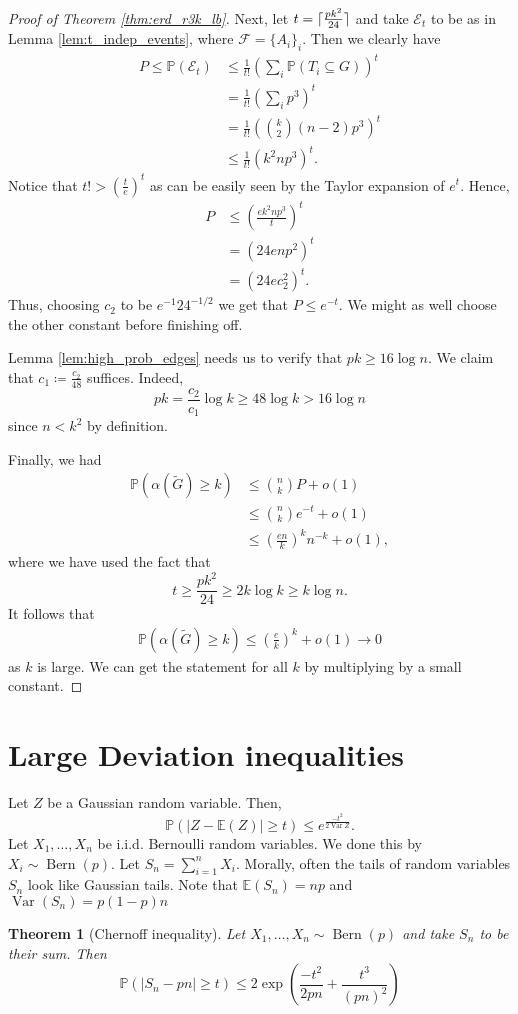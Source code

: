 \documentclass{report}
\DeclareMathOperator{\Var}{Var}
\DeclareMathOperator{\Bern}{Bern}
\DeclarePairedDelimiter\ceil{\lceil}{\rceil}
\theoremstyle{definition}
\theoremstyle{plain}
\newtheorem{thm}{Theorem}
\theoremstyle{definition}
\begin{document}
\begin{proof}[Proof of Theorem \ref{thm:erd_r3k_lb}]
		Next, let $t = \ceil{\frac{pk^2}{24}}$ and take $\mathcal{E}_t$ to be as in Lemma \ref{lem:t_indep_events}, where $\mathcal{F} = \{A_i\}_i$. Then we clearly have
		\begin{align*}
			P \leq \mathbb{P}(\mathcal{E}_t) &\leq \frac{1}{t!}\left(\sum_{i}\mathbb{P}(T_i\subseteq G)\right)^t\\
			&= \frac{1}{t!}\left(\sum_{i}p^3\right)^t\\
			&= \frac{1}{t!}\left(\binom{k}{2}(n-2) p^3\right)^t\\
			&\leq \frac{1}{t!}(k^2np^3)^t.
		\end{align*}
		Notice that $t!> \left(\frac{t}{e}\right)^t$ as can be easily seen by the Taylor expansion of $e^t$. Hence,
		\begin{align*}
			P &\leq \left(\frac{ek^2np^3}{t}\right)^t\\
			&= (24enp^2)^t\\
			&= (24ec_2^2)^t.
		\end{align*}
		Thus, choosing $c_2$ to be $e^{-1}24^{-1/2}$ we get that $P\leq e^{-t}$. We might as well choose the other constant before finishing off.
		
		Lemma \ref{lem:high_prob_edges} needs us to verify that $pk \geq 16\log n$. We claim that $c_1 \coloneqq \frac{c_2}{48}$ suffices. Indeed,
		\[
			pk = \frac{c_2}{c_1} \log k \geq 48 \log k > 16 \log n
		\]
		since $n < k^2$ by definition. 
		
		Finally, we had 
		\begin{align*}
			\mathbb{P}(\alpha(\tilde{G}) \geq k) &\leq \binom{n}{k}P + o(1)\\
			&\leq \binom{n}{k}e^{-t} + o(1)\\
			&\leq \left(\frac{en}{k}\right)^kn^{-k} + o(1),
		\end{align*}
		where we have used the fact that
		\[
			t \geq \frac{pk^2}{24} \geq 2k\log k \geq k\log n.
		\]
		It follows that 
		\begin{align*}
			\mathbb{P}(\alpha(\tilde{G}) \geq k) \leq \left(\frac{e}{k}\right)^k + o(1) \to 0
		\end{align*}
		as $k$ is large. We can get the statement for all $k$ by multiplying by a small constant.
	\end{proof}
	\section{Large Deviation inequalities}
	Let $Z$ be a Gaussian random variable. Then,
	\[
		\mathbb{P}(|Z - \mathbb{E}(Z)| \geq t) \leq e^{\frac{-t^2}{2\Var Z}}.
	\]
	Let $X_1,\ldots, X_n$ be i.i.d. Bernoulli random variables. We done this by $X_i\sim \Bern(p)$. Let $S_n = \sum_{i=1}^{n}X_i$. Morally, often the tails of random variables $S_n$ look like Gaussian tails. Note that $\mathbb{E}(S_n) = np$ and $\Var(S_n) = p(1-p)n$
	\begin{thm}[Chernoff inequality]
		Let $X_1,\ldots,X_n \sim \Bern(p)$ and take $S_n$ to be their sum. Then
		\[
			\mathbb{P}(|S_n - pn| \geq t) \leq 2\exp\left(\frac{-t^2}{2pn} + \frac{t^3}{(pn)^2}\right)
		\]
	\end{thm}
\end{document}
